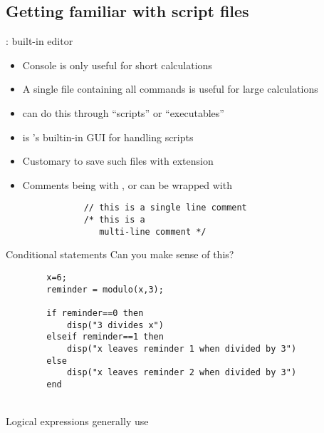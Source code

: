 \subsection{Getting familiar with script files}
\begin{frame}[fragile]{\scinotes: built-in editor}
    \begin{itemize}
        \setitemsep{1em}
        \item Console is only useful for short calculations
        \item A single file containing all commands is useful for large calculations
        \item<2-> \scilab{} can do this through ``scripts'' or ``executables''
        \item<3-> \scinotes{} is \scilab's builtin-in GUI for handling scripts
        \item<4-> Customary to save such files with  extension
        \item<5-> Comments being with \inlinecode{//}, or can be wrapped with \inlinecode{/* */}
        \begin{lstlisting}
            // this is a single line comment
            /* this is a
               multi-line comment */
        \end{lstlisting}
    \end{itemize}
\end{frame}

\begin{frame}[fragile]{Conditional statements}
    Can you make sense of this?
    \begin{lstlisting}
        x=6;
        reminder = modulo(x,3);
        
        if reminder==0 then
            disp("3 divides x")
        elseif reminder==1 then
            disp("x leaves reminder 1 when divided by 3")
        else
            disp("x leaves reminder 2 when divided by 3")
        end
    \end{lstlisting}
    \\[1em]
    Logical expressions generally use 
\end{frame}

